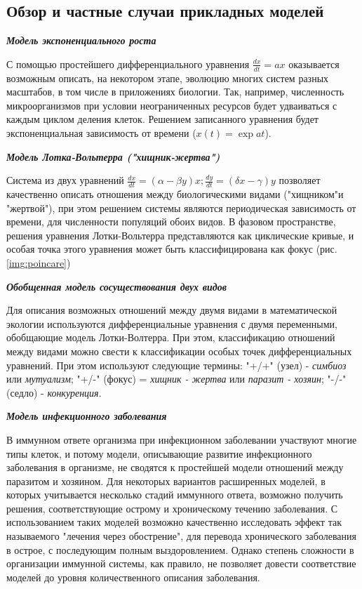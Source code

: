 \subsection{Обзор и частные случаи прикладных моделей} \label{sect_appliedmodels}

\noindent
\textbf{ \textit{Модель экспоненциального роста} } 

С помощью простейшего дифференциального уравнения $\frac{dx}{dt} = ax$ оказывается возможным описать, на некотором этапе, эволюцию многих систем разных масштабов, в том числе в приложениях биологии. Так, например, численность микроорганизмов при условии неограниченных ресурсов будет удваиваться с каждым циклом деления клеток. Решением записанного уравнения будет экспоненциальная зависимость от времени ($x(t)=\exp{at}$).


\noindent
\textbf{ \textit{Модель Лотка-Вольтерра ("хищник-жертва")} } 

Система из двух уравнений $\frac{dx}{dt}=(\alpha - \beta y)x; \frac{dy}{dt}=(\delta x - \gamma) y$ позволяет качественно описать отношения между биологическими видами ("хищником"и "жертвой"), при этом решением системы являются периодическая зависимость от времени, для численности популяций обоих видов. В фазовом пространстве, решения уравнения Лотки-Вольтерра представляются как циклические кривые, и особая точка этого уравнения может быть классифицирована как фокус (рис. \ref{img:poincare}) 

\noindent
\textbf{ \textit{Обобщенная модель сосуществования двух видов} } 

Для описания возможных отношений между двумя видами в математической экологии используются дифференциальные уравнения с двумя переменными, обобщающие модель Лотки-Волтерра. При этом, классификацию отношений между видами можно свести к классификации особых точек дифференциальных уравнений. При этом используют следующие термины: "+/+" (узел) - \textit{симбиоз} или \textit{мутуализм}; "+/-" (фокус) = \textit{хищник - жертва} или \textit{паразит  - хозяин}; "-/-" (седло) - \textit{конкуренция}.

\noindent
\textbf{ \textit{Модель инфекционного заболевания} }

В иммунном ответе организма при инфекционном заболевании участвуют многие типы клеток, и потому модели, описывающие развитие инфекционного заболевания в организме, не сводятся к простейшей модели отношений между паразитом и хозяином. Для некоторых вариантов расширенных моделей, в которых учитывается несколько стадий иммунного ответа, возможно получить решения, соответствующие острому и хроническому течению заболевания. С использованием таких моделей возможно качественно исследовать эффект так называемого "лечения через обострение", для перевода хронического заболевания в острое, с последующим полным выздоровлением. Однако степень сложности в организации иммунной системы, как правило, не позволяет довести соответствие моделей до уровня количественного описания заболевания.

